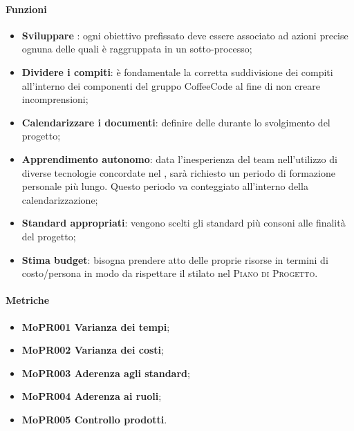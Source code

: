 \documentclass[../piano-di-qualifica.tex]{subfiles}
\begin{document}
\paragraph{Funzioni}
\label{sub:funzioni_1}

\begin{itemize}
    \item \textbf{Sviluppare }: ogni obiettivo prefissato deve essere associato ad azioni precise ognuna delle quali è raggruppata in un sotto-processo;
    \item \textbf{Dividere i compiti}: è fondamentale la corretta suddivisione dei compiti all'interno dei componenti del gruppo CoffeeCode al fine di non creare incomprensioni;
    \item \textbf{Calendarizzare i documenti}: definire delle  durante lo svolgimento del progetto;
    \item \textbf{Apprendimento autonomo}: data l'inesperienza del team nell'utilizzo di diverse tecnologie concordate nel , sarà richiesto un periodo di formazione personale più lungo. Questo periodo va conteggiato all'interno della calendarizzazione;
    \item \textbf{Standard appropriati}: vengono scelti gli standard più consoni alle finalità del progetto;
    \item \textbf{Stima budget}: bisogna prendere atto delle proprie risorse in termini di costo/persona in modo da rispettare il  stilato nel \textsc{Piano di Progetto}.
\end{itemize}

\paragraph{Metriche}
\label{sub:metriche_1}
\begin{itemize}
    \item \textbf{MoPR001 Varianza dei tempi};
    \item \textbf{MoPR002 Varianza dei costi};
    \item \textbf{MoPR003 Aderenza agli standard};
    \item \textbf{MoPR004 Aderenza ai ruoli};
    \item \textbf{MoPR005 Controllo prodotti}.
\end{itemize}
\end{document}
